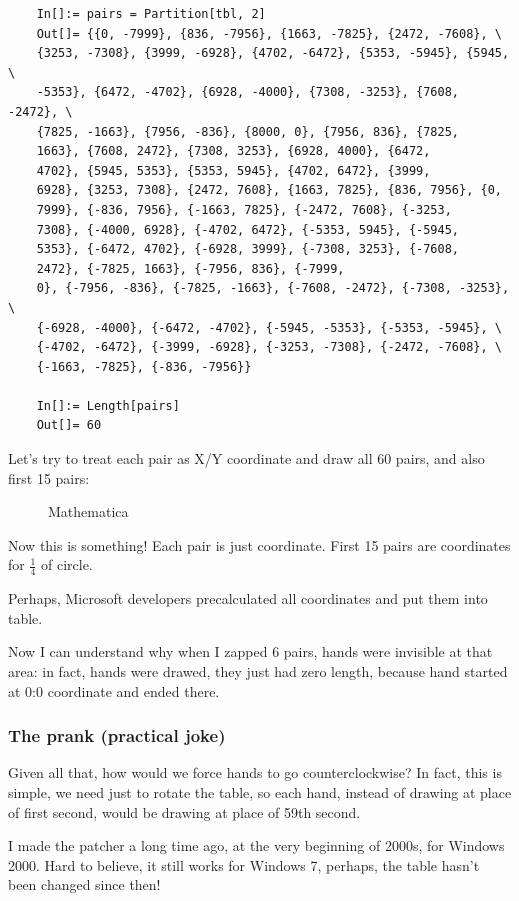 \begin{lstlisting}
	In[]:= pairs = Partition[tbl, 2]
	Out[]= {{0, -7999}, {836, -7956}, {1663, -7825}, {2472, -7608}, \
	{3253, -7308}, {3999, -6928}, {4702, -6472}, {5353, -5945}, {5945, \
	-5353}, {6472, -4702}, {6928, -4000}, {7308, -3253}, {7608, -2472}, \
	{7825, -1663}, {7956, -836}, {8000, 0}, {7956, 836}, {7825, 
	1663}, {7608, 2472}, {7308, 3253}, {6928, 4000}, {6472, 
	4702}, {5945, 5353}, {5353, 5945}, {4702, 6472}, {3999, 
	6928}, {3253, 7308}, {2472, 7608}, {1663, 7825}, {836, 7956}, {0, 
	7999}, {-836, 7956}, {-1663, 7825}, {-2472, 7608}, {-3253, 
	7308}, {-4000, 6928}, {-4702, 6472}, {-5353, 5945}, {-5945, 
	5353}, {-6472, 4702}, {-6928, 3999}, {-7308, 3253}, {-7608, 
	2472}, {-7825, 1663}, {-7956, 836}, {-7999, 
	0}, {-7956, -836}, {-7825, -1663}, {-7608, -2472}, {-7308, -3253}, \
	{-6928, -4000}, {-6472, -4702}, {-5945, -5353}, {-5353, -5945}, \
	{-4702, -6472}, {-3999, -6928}, {-3253, -7308}, {-2472, -7608}, \
	{-1663, -7825}, {-836, -7956}}

	In[]:= Length[pairs]
	Out[]= 60
\end{lstlisting}

Let's try to treat each pair as X/Y coordinate and draw all 60 pairs, and also first 15 pairs:

\begin{figure}[H]
\centering
{}
\caption{Mathematica}
\end{figure}

Now this is something!
Each pair is just coordinate.
First 15 pairs are coordinates for $\frac{1}{4}$ of circle.

Perhaps, Microsoft developers precalculated all coordinates and put them into table.

Now I can understand why when I zapped 6 pairs, hands were invisible at that area: in fact, hands were drawed,
they just had zero length, because hand started at 0:0 coordinate and ended there.

\subsubsection{The prank (practical joke)}

Given all that, how would we force hands to go counterclockwise?
In fact, this is simple, we need just to rotate the table, so each hand, instead of drawing at place of first second,
would be drawing at place of 59th second.

I made the patcher a long time ago, at the very beginning of 2000s, for Windows 2000.
Hard to believe, it still works for Windows 7, perhaps, the table hasn't been changed since then!

